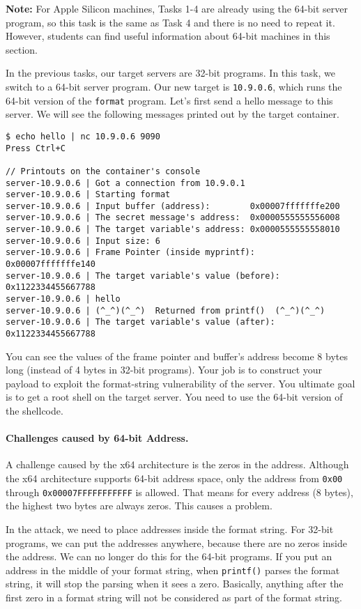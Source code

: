\textbf{Note:} For Apple Silicon machines, Tasks 1-4 
are already using the 64-bit server program, so this task
is the same as Task 4 and there is no need to repeat it. 
However, students can find useful information about 64-bit 
machines in this section. 

In the previous tasks, our target servers are 32-bit
programs. In this task, we switch to a 64-bit server
program.  Our new target is \texttt{10.9.0.6}, which
runs the 64-bit version of the \texttt{format} program.
Let's first send a hello message to this server.
We will see the following messages printed out by the target container.


\begin{lstlisting}
$ echo hello | nc 10.9.0.6 9090
Press Ctrl+C

// Printouts on the container's console
server-10.9.0.6 | Got a connection from 10.9.0.1
server-10.9.0.6 | Starting format
server-10.9.0.6 | Input buffer (address):        0x00007fffffffe200
server-10.9.0.6 | The secret message's address:  0x0000555555556008
server-10.9.0.6 | The target variable's address: 0x0000555555558010
server-10.9.0.6 | Input size: 6
server-10.9.0.6 | Frame Pointer (inside myprintf):      0x00007fffffffe140
server-10.9.0.6 | The target variable's value (before): 0x1122334455667788
server-10.9.0.6 | hello
server-10.9.0.6 | (^_^)(^_^)  Returned from printf()  (^_^)(^_^)
server-10.9.0.6 | The target variable's value (after):  0x1122334455667788
\end{lstlisting}
 

You can see the values of the frame pointer and buffer's address
become 8 bytes long (instead of 4 bytes in 32-bit programs).
Your job is to construct your payload to exploit the format-string 
vulnerability of the server.
You ultimate goal is to get a root shell on
the target server. You need to use the 64-bit version of the shellcode.


\paragraph{Challenges caused by 64-bit Address.}
A challenge caused by the x64 architecture is the zeros in the address.
Although the x64 architecture
supports 64-bit address space, only the address from
\texttt{0x00} through \texttt{0x00007FFFFFFFFFFF} is allowed. That means for
every address (8 bytes), the highest two bytes are always zeros.
This causes a problem.

In the attack, we need to place addresses inside the format string. For
32-bit programs, we can put the addresses anywhere, because there
are no zeros inside the address. We can no longer do this
for the 64-bit programs. If you put an address in the middle of
your format string, when \texttt{printf()} parses the
format string, it will stop the parsing when it sees a zero. Basically,
anything after the first zero in a format string will not
be considered as part of the format string.

